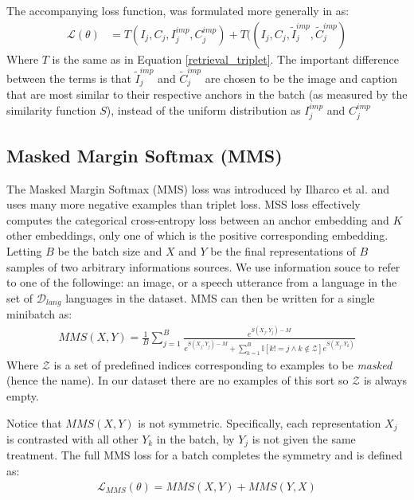 The accompanying loss function, was formulated more generally in \cite{harwath2019learning} as:
\begin{align}
    \label{eq:triplet_full}
    \mathcal{L}(\theta) &= T(I_j, C_j, I_j^{imp}, C_j^{imp}) + T((I_j, C_j, \tilde{I}_j^{imp}, \tilde{C}_j^{imp})
\end{align}
Where $T$ is the same as in Equation \ref{retrieval_triplet}. 
The important difference between the terms is that $\tilde{I}_j^{imp}$ and $\tilde{C}_j^{imp}$ are chosen to be the image and caption that are most similar to their respective anchors in the batch (as measured by the similarity function $S$),
instead of the uniform distribution as $I_j^{imp}$ and $C_j^{imp}$


\subsection{Masked Margin Softmax (MMS)}
\label{section:mms_loss}
The Masked Margin Softmax (MMS) loss was introduced by Ilharco et al. \cite{ilharco2019large} and uses many more negative examples than triplet loss.
MSS loss effectively computes the categorical cross-entropy loss between an anchor embedding and $K$ other embeddings, only one of which is the positive corresponding embedding.
Letting $B$ be the batch size and $X$ and $Y$ be the final representations of $B$ samples of two arbitrary informations sources.
We use information souce to refer to one of the followinge: an image, or a speech utterance from a language in the set of $\mathcal{D}_{lang}$ languages in the dataset. 
MMS can then be written for a single minibatch as:
\begin{align}
    \label{MMS_base}
    MMS(X,Y) = \frac{1}{B}\sum_{j=1}^B\frac{e^{S(X_j, Y_j)-M}}{e^{S(X_j, Y_j)-M} +\sum_{k=1}^{B} \mathbb{I}[k!=j \land k \notin \mathcal{Z}]e^{S(X_j, Y_k)}}
\end{align}
Where $\mathcal{Z}$ is a set of predefined indices corresponding to examples to be \textit{masked} (hence the name).
In our dataset there are no examples of this sort so $\mathcal{Z}$ is always empty.

Notice that $MMS(X, Y)$ is not symmetric. 
Specifically, each representation $X_j$ is contrasted with all other $Y_k$ in the batch, by $Y_j$ is not given the same treatment.
The full MMS loss for a batch completes the symmetry and is defined as:
\begin{align}
    \label{eq:mms}
    \mathcal{L}_{MMS}(\theta) = MMS(X,Y) + MMS(Y,X)
\end{align}

